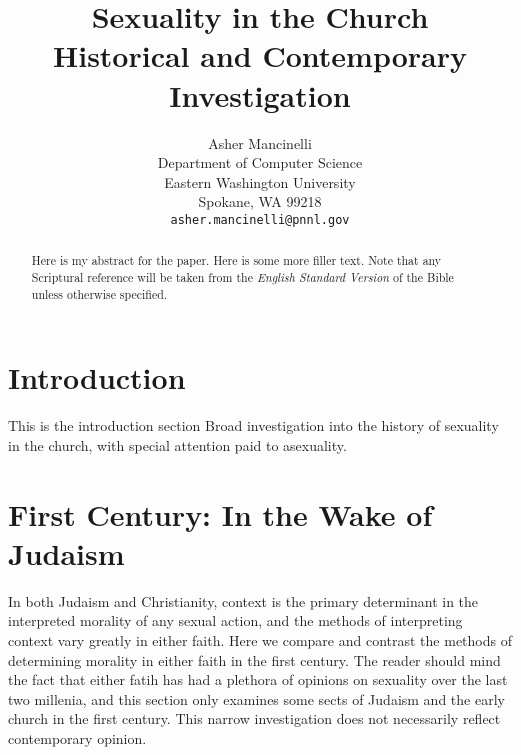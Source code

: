 \documentclass{article}
\title{
    Sexuality in the Church \\ 
    \large Historical and Contemporary Investigation}
\author{
  Asher Mancinelli \\
  Department of Computer Science\\
  Eastern Washington University\\
  Spokane, WA 99218 \\
  \texttt{asher.mancinelli@pnnl.gov} \\ }
\begin{document}
\maketitle

\begin{abstract}
    Here is my abstract for the paper. Here is some more filler text. Note
    that any Scriptural reference will be taken from the \textit{English
    Standard Version} of the Bible unless otherwise specified.
\end{abstract}


\linespread{2}

\section{Introduction}
    This is the introduction section
    Broad investigation into the history of sexuality in the church, with
    special attention paid to asexuality.

\section{First Century: In the Wake of Judaism}

    In both Judaism and Christianity, context is the primary determinant in 
    the interpreted morality of any sexual action, and the methods of interpreting
    context vary greatly in either faith. Here we compare and contrast the 
    methods of determining morality in either faith in the first century. The
    reader should mind the fact that either fatih has had a plethora of opinions on
    sexuality over the last two millenia, and this section only examines some sects
    of Judaism and the early church in the first century. This narrow investigation
    does not necessarily reflect contemporary opinion.
\end{document}
